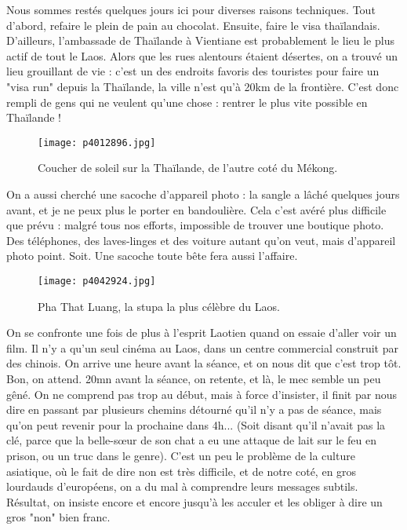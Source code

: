 \documentclass{book}
\begin{document}
Nous sommes restés quelques jours ici pour diverses raisons techniques. Tout d'abord, refaire le plein de pain au chocolat. Ensuite, faire le visa thaïlandais. D'ailleurs, l'ambassade de Thaïlande à Vientiane est probablement le lieu le plus actif de tout le Laos. Alors que les rues alentours étaient désertes, on a trouvé un lieu grouillant de vie : c'est un des endroits favoris des touristes pour faire un "visa run" depuis la Thaïlande, la ville n'est qu'à 20km de la frontière. C'est donc rempli de gens qui ne veulent qu'une chose : rentrer le plus vite possible en Thaïlande !


\begin{figure}[h]
\centering
\texttt{[image: p4012896.jpg]}
\caption*{Coucher de soleil sur la Thaïlande, de l'autre coté du Mékong.}
\end{figure}

On a aussi cherché une sacoche d'appareil photo : la sangle a lâché quelques jours avant, et je ne peux plus le porter en bandoulière. Cela c'est avéré plus difficile que prévu : malgré tous nos efforts, impossible de trouver une boutique photo. Des téléphones, des laves-linges et des voiture autant qu'on veut, mais d'appareil photo point. Soit. Une sacoche toute bête fera aussi l'affaire.


\begin{figure}[h]
\centering
\texttt{[image: p4042924.jpg]}
\caption*{Pha That Luang, la stupa la plus célèbre du Laos.}
\end{figure}

On se confronte une fois de plus à l'esprit Laotien quand on essaie d'aller voir un film. Il n'y a qu'un seul cinéma au Laos, dans un centre commercial construit par des chinois. On arrive une heure avant la séance, et on nous dit que c'est trop tôt. Bon, on attend. 20mn avant la séance, on retente, et là, le mec semble un peu gêné. On ne comprend pas trop au début, mais à force d'insister, il finit par nous dire en passant par plusieurs chemins détourné qu'il n'y a pas de séance, mais qu'on peut revenir pour la prochaine dans 4h... (Soit disant qu'il n'avait pas la clé, parce que la belle-sœur de son chat a eu une attaque de lait sur le feu en prison, ou un truc dans le genre). C'est un peu le problème de la culture asiatique, où le fait de dire non est très difficile, et de notre coté, en gros lourdauds d'européens, on a du mal à comprendre leurs messages subtils. Résultat, on insiste encore et encore jusqu'à les acculer et les obliger à dire un gros "non" bien franc.
\end{document}
